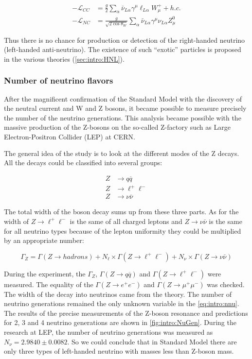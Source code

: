 \documentclass[../main.tex]{subfiles}
\begin{document}
\begin{align}
-\mathcal{L}_{CC}&=\frac{g}{2}\sum_\alpha\bar{\nu}_{L\alpha}\gamma^\mu\ell_{L\alpha}W^+_\mu+h.c. \\ \nonumber
-\mathcal{L}_{NC}&=\frac{g}{\sqrt{2\cos{\theta_W}}}\sum_\alpha\bar{\nu}_{L\alpha}\gamma^\mu\nu_{L\alpha}Z^0_\mu
\end{align}

Thus there is no chance for production or detection of the right-handed neutrino (left-handed anti-neutrino). The existence of such ``exotic'' particles is proposed in the various theories (\autoref{sec:intro:HNL}).

\subsubsection{Number of neutrino flavors}
\label{sec:intro:LEP}
After the magnificent confirmation of the Standard Model with the discovery of the neutral current and W and Z bosons, it became possible to measure precisely the number of the neutrino generations. This analysis became possible with the massive production of the Z-bosons on the so-called Z-factory such as Large Electron-Positron Collider (LEP) at CERN.

The general idea of the study is to look at the different modes of the Z decays. All the decays could be classified into several groups:

\begin{align}
Z&\to q\overline{q} \nonumber \\
Z&\to \ell^+\ell^- \\
Z&\to \nu\bar{\nu} \nonumber
\end{align}

The total width of the boson decay sums up from these three parts. As for the width of $Z\to \ell^+\ell^-$ is the same of all charged leptons and $Z\to \nu\bar{\nu}$ is the same for all neutrino types because of the lepton uniformity they could be multiplied by an appropriate number:

\begin{equation}
\Gamma_Z=\Gamma(Z\to hadrons)+N_{\ell}\times\Gamma(Z\to \ell^+\ell^-) + N_{\nu}\times\Gamma(Z\to \nu\bar{\nu})
\label{eq:intro:nnu}
\end{equation}

During the experiment, the $\Gamma_Z$, $\Gamma(Z\to q\overline{q})$ and $\Gamma(Z\to \ell^+\ell^-)$ were measured. The equality of the $\Gamma(Z\to e^+e^-)$ and $\Gamma(Z\to \mu^+\mu^-)$ was checked. The width of the decay into neutrinos came from the theory. The number of neutrino generations remained the only unknown variable in the \autoref{eq:intro:nnu}. The results of the precise measurements of the Z-boson resonance and predictions for 2, 3 and 4 neutrino generations are shown in \autoref{fig:intro:NuGen}. During the research at LEP, the number of neutrino generations was measured as $N_{\nu}=2.9840\pm0.0082$. So we could conclude that in Standard Model there are only three types of left-handed neutrino with masses less than Z-boson mass.
\end{document}
